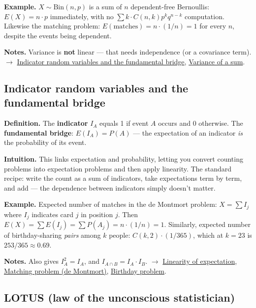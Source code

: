 \documentclass[11pt,a4paper]{article}
\begin{document}
\textbf{Example.} $X \sim \mathrm{Bin}(n, p)$ is a sum of $n$ dependent-free Bernoullis: $E(X) = n\cdot p$ immediately, with no $\sum  k\cdot C(n,k)p^{k}q^{n-k}$ computation. Likewise the matching problem: $E(\text{matches}) = n\cdot (1/n) = 1$ for every $n$, despite the events being dependent.

\textbf{Notes.} Variance is \textbf{not} linear --- that needs independence (or a covariance term). $\to$ \hyperref[sec:indicator-random-variables-and-the-fundamental-bridge]{Indicator random variables and the fundamental bridge}, \hyperref[sec:variance-of-a-sum]{Variance of a sum}.

\subsection{Indicator random variables and the fundamental bridge}\label{sec:indicator-random-variables-and-the-fundamental-bridge}

\textbf{Definition.} The \textbf{indicator} $I_A$ equals 1 if event $A$ occurs and 0 otherwise. The \textbf{fundamental bridge}: $E(I_A) = P(A)$ --- the expectation of an indicator \textit{is} the probability of its event.

\textbf{Intuition.} This links expectation and probability, letting you convert counting problems into expectation problems and then apply linearity. The standard recipe: write the count as a sum of indicators, take expectations term by term, and add --- the dependence between indicators simply doesn't matter.

\textbf{Example.} Expected number of matches in the de Montmort problem: $X = \sum  I_j$ where $I_j$ indicates card $j$ in position $j$. Then $E(X) = \sum  E(I_j) = \sum  P(A_j) = n\cdot (1/n) = 1$. Similarly, expected number of birthday-sharing \textit{pairs} among $k$ people: $C(k,2)\cdot (1/365)$, which at $k = 23$ is $253/365 \approx  0.69$.

\textbf{Notes.} Also gives $I_A^{2} = I_A$, and $I_{A\cap B} = I_A\cdot I_B$. $\to$ \hyperref[sec:linearity-of-expectation]{Linearity of expectation}, \hyperref[sec:matching-problem-de-montmort]{Matching problem (de Montmort)}, \hyperref[sec:birthday-problem]{Birthday problem}.

\subsection{LOTUS (law of the unconscious statistician)}\label{sec:lotus-law-of-the-unconscious-statistician}
\end{document}
